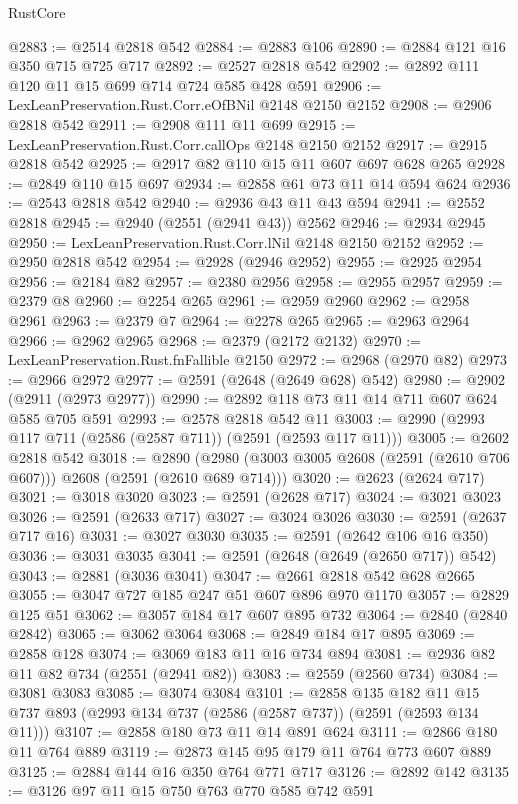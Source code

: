 \begin{lexlean}{RustCore}
\begin{coremodule}
@2883 := @2514 @2818 @542
@2884 := @2883 @106
@2890 := @2884 @121 @16 @350 @715 @725 @717
@2892 := @2527 @2818 @542
@2902 := @2892 @111 @120 @11 @15 @699 @714 @724 @585 @428 @591
@2906 := LexLeanPreservation.Rust.Corr.eOfBNil @2148 @2150 @2152
@2908 := @2906 @2818 @542
@2911 := @2908 @111 @11 @699
@2915 := LexLeanPreservation.Rust.Corr.callOps @2148 @2150 @2152
@2917 := @2915 @2818 @542
@2925 := @2917 @82 @110 @15 @11 @607 @697 @628 @265
@2928 := @2849 @110 @15 @697
@2934 := @2858 @61 @73 @11 @14 @594 @624
@2936 := @2543 @2818 @542
@2940 := @2936 @43 @11 @43 @594
@2941 := @2552 @2818
@2945 := @2940 (@2551 (@2941 @43)) @2562
@2946 := @2934 @2945
@2950 := LexLeanPreservation.Rust.Corr.lNil @2148 @2150 @2152
@2952 := @2950 @2818 @542
@2954 := @2928 (@2946 @2952)
@2955 := @2925 @2954
@2956 := @2184 @82
@2957 := @2380 @2956
@2958 := @2955 @2957
@2959 := @2379 @8
@2960 := @2254 @265
@2961 := @2959 @2960
@2962 := @2958 @2961
@2963 := @2379 @7
@2964 := @2278 @265
@2965 := @2963 @2964
@2966 := @2962 @2965
@2968 := @2379 (@2172 @2132)
@2970 := LexLeanPreservation.Rust.fnFallible @2150
@2972 := @2968 (@2970 @82)
@2973 := @2966 @2972
@2977 := @2591 (@2648 (@2649 @628) @542)
@2980 := @2902 (@2911 (@2973 @2977))
@2990 := @2892 @118 @73 @11 @14 @711 @607 @624 @585 @705 @591
@2993 := @2578 @2818 @542 @11
@3003 := @2990 (@2993 @117 @711 (@2586 (@2587 @711)) (@2591 (@2593 @117 @11)))
@3005 := @2602 @2818 @542
@3018 := @2890 (@2980 (@3003 @3005 @2608 (@2591 (@2610 @706 @607))) @2608 (@2591 (@2610 @689 @714)))
@3020 := @2623 (@2624 @717)
@3021 := @3018 @3020
@3023 := @2591 (@2628 @717)
@3024 := @3021 @3023
@3026 := @2591 (@2633 @717)
@3027 := @3024 @3026
@3030 := @2591 (@2637 @717 @16)
@3031 := @3027 @3030
@3035 := @2591 (@2642 @106 @16 @350)
@3036 := @3031 @3035
@3041 := @2591 (@2648 (@2649 (@2650 @717)) @542)
@3043 := @2881 (@3036 @3041)
@3047 := @2661 @2818 @542 @628 @2665
@3055 := @3047 @727 @185 @247 @51 @607 @896 @970 @1170
@3057 := @2829 @125 @51
@3062 := @3057 @184 @17 @607 @895 @732
@3064 := @2840 (@2840 @2842)
@3065 := @3062 @3064
@3068 := @2849 @184 @17 @895
@3069 := @2858 @128
@3074 := @3069 @183 @11 @16 @734 @894
@3081 := @2936 @82 @11 @82 @734 (@2551 (@2941 @82))
@3083 := @2559 (@2560 @734)
@3084 := @3081 @3083
@3085 := @3074 @3084
@3101 := @2858
    @135
    @182
    @11
    @15
    @737
    @893
    (@2993 @134 @737 (@2586 (@2587 @737)) (@2591 (@2593 @134 @11)))
@3107 := @2858 @180 @73 @11 @14 @891 @624
@3111 := @2866 @180 @11 @764 @889
@3119 := @2873 @145 @95 @179 @11 @764 @773 @607 @889
@3125 := @2884 @144 @16 @350 @764 @771 @717
@3126 := @2892 @142
@3135 := @3126 @97 @11 @15 @750 @763 @770 @585 @742 @591

\end{coremodule}
\end{lexlean}
